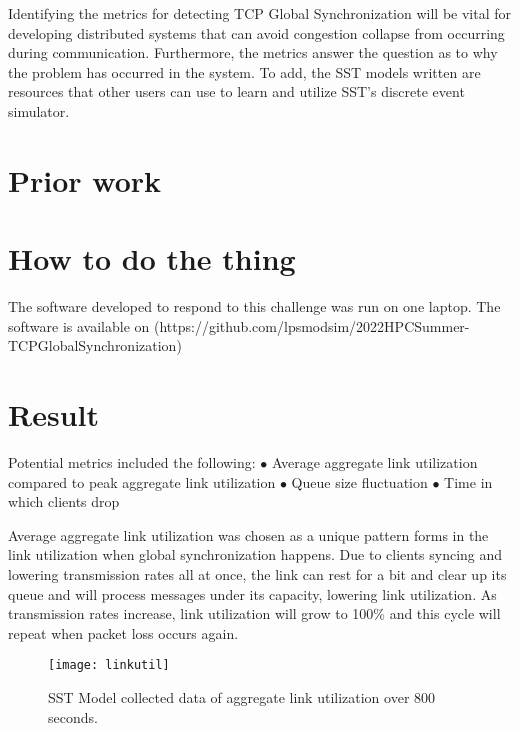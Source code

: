 \documentclass{article}
\begin{document}
Identifying the metrics for detecting TCP Global Synchronization will be vital for developing distributed systems that can avoid congestion collapse from occurring during communication. Furthermore, the metrics answer the question as to why the problem has occurred in the system. To add, the SST models written are resources that other users can use to learn and utilize SST's discrete event simulator.

\section{Prior work} %



\section{How to do the thing}

The software developed to respond to this challenge was run on one laptop.
The software is available on (https://github.com/lpsmodsim/2022HPCSummer-TCPGlobalSynchronization)

\section{Result} %

Potential metrics included the following:\newline
	$\bullet$ Average aggregate link utilization compared to peak aggregate link utilization \newline
	$\bullet$ Queue size fluctuation \newline
	$\bullet$ Time in which clients drop \newline\newline

	Average aggregate link utilization was chosen as a unique pattern forms in the link utilization when global synchronization happens. Due to clients syncing and lowering transmission rates all at once, the link can rest for a bit and clear up its queue and will process messages under its capacity, lowering link utilization. As transmission rates increase, link utilization will grow to 100\% and this cycle will repeat when packet loss occurs again.\newline
	
	\begin{figure}[H]
	\caption{SST Model collected data of aggregate link utilization over 800 seconds.}
	\centering
	\texttt{[image: linkutil]}
	\end{figure}
	
\end{document}
